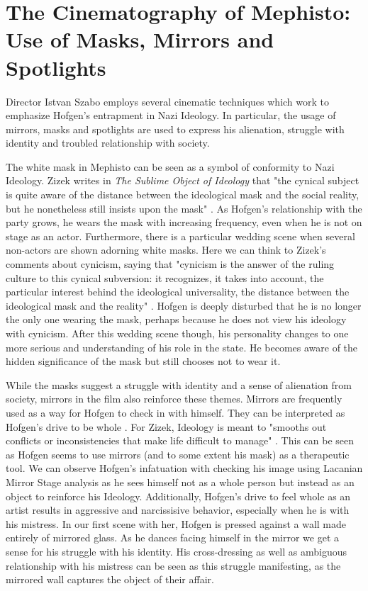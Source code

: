 \documentclass[a4paper, 11pt]{article} %
\begin{document}
\section*{The Cinematography of Mephisto: Use of Masks, Mirrors and Spotlights}

Director Istvan Szabo employs several cinematic techniques which work to emphasize Hofgen's entrapment in Nazi Ideology.  In particular, the usage of mirrors, masks and spotlights are used to express his alienation, struggle with identity and troubled relationship with society.  

The white mask in Mephisto can be seen as a symbol of conformity to Nazi Ideology.  Zizek writes in \textit{The Sublime Object of Ideology} that "the cynical subject is quite aware of the distance between the ideological mask and the social reality, but he nonetheless still insists upon the mask" \cite{Zizek}.  As Hofgen's relationship with the party grows, he wears the mask with increasing frequency, even when he is not on stage as an actor.  Furthermore, there is a particular wedding scene when several non-actors are shown adorning white masks.  Here we can think to Zizek's comments about cynicism, saying that "cynicism is the answer of the ruling culture to this cynical subversion: it recognizes, it takes into account, the particular interest behind the ideological universality, the distance between the ideological mask and the reality" \cite{Zizek}.  Hofgen is deeply disturbed that he is no longer the only one wearing the mask, perhaps because he does not view his ideology with cynicism.  After this wedding scene though, his personality changes to one more serious and understanding of his role in the state.  He becomes aware of the hidden significance of the mask but still chooses not to wear it.  

While the masks suggest a struggle with identity and a sense of alienation from society, mirrors in the film also reinforce these themes.  Mirrors are frequently used as a way for Hofgen to check in with himself.  They can be interpreted as Hofgen's drive to be whole \cite{Lecture2}.  For Zizek, Ideology is meant to "smooths out conflicts or inconsistencies that make life difficult to manage" \cite{Zizek}.  This can be seen as Hofgen seems to use mirrors (and to some extent his mask) as a therapeutic tool.  
We can observe Hofgen's infatuation with checking his image using Lacanian Mirror Stage analysis as he sees himself not as a whole person but instead as an object to reinforce his Ideology.  Additionally, Hofgen's drive to feel whole as an artist results in aggressive and narcissisive behavior, especially when he is with his mistress.  In our first scene with her, Hofgen is pressed against a wall made entirely of mirrored glass.  As he dances facing himself in the mirror we get a sense for his struggle with his identity.  His cross-dressing as well as ambiguous relationship with his mistress can be seen as this struggle manifesting, as the mirrored wall captures the object of their affair.  
\end{document}
